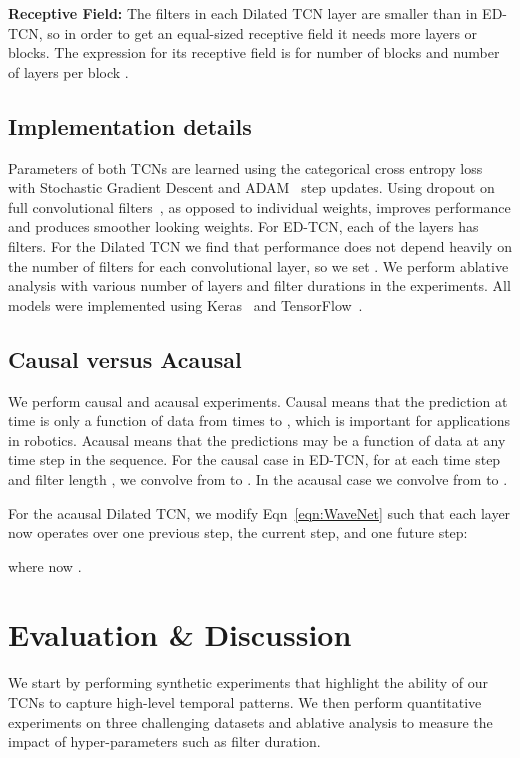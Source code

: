 \documentclass[10pt,twocolumn,letterpaper]{article}
\newcommand{\fakesubsection}[1]{\smallskip\noindent\textbf{#1:}}
\begin{document}
\fakesubsection{Receptive Field} The filters in each Dilated TCN layer are smaller than in ED-TCN, so in order to get an equal-sized receptive field it needs more layers or blocks. The expression for its receptive field is  for number of blocks  and number of layers per block .

\subsection{Implementation details}
\label{sec:details}
Parameters of both TCNs are learned using the categorical cross entropy loss with Stochastic Gradient Descent and ADAM~\cite{ADAM} step updates. 
Using dropout on full convolutional filters~\cite{tompson_cvpr_2015}, as opposed to individual weights, improves performance and produces smoother looking weights.
For ED-TCN, each of the  layers has  filters.
For the Dilated TCN we find that performance does not depend heavily on the number of filters for each convolutional layer, so we set .
We perform ablative analysis with various number of layers and filter durations in the experiments.
All models were implemented using Keras~\cite{keras} and TensorFlow~\cite{tensorflow}.





\subsection{Causal versus Acausal}

We perform causal and acausal experiments. Causal means that the prediction at time  is only a function of data from times  to , which is important for applications in robotics. Acausal means that the predictions may be a function of data at any time step in the sequence. 
For the causal case in ED-TCN, for at each time step  and filter length , we convolve from  to . In the acausal case we convolve from  to . 


For the acausal Dilated TCN, we modify Eqn~\ref{eqn:WaveNet} such that each layer now operates over one previous step, the current step, and one future step:

where now .




 


\section{Evaluation \& Discussion}
\label{sec:evaluation}
We start by performing synthetic experiments that highlight the ability of our TCNs to capture high-level temporal patterns. We then perform quantitative experiments on three challenging datasets and ablative analysis to measure the impact of hyper-parameters such as filter duration.
\end{document}
